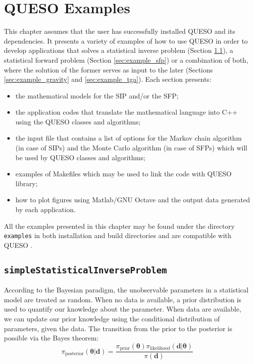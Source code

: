 

\chapter{QUESO Examples}\label{chap:Queso-examples}

This chapter assumes that the user has successfully installed QUESO and its dependencies.
%
It presents a variety of  examples of how to use QUESO in order to develop applications that solves a statistical inverse problem (Section \ref{sec:example_sip}), a statistical forward problem (Section \ref{sec:example_sfp}) or a combination of both, where the solution of the former serves as input to the later (Sections \ref{sec:example_gravity} and \ref{sec:example_tga}). 
Each section presents: 
\begin{itemize}
 \item the mathematical models for the SIP and/or the SFP; \vspace*{-6pt}
 \item the application codes  that translate the mathematical language into C++ using the QUESO classes and algorithms;\vspace*{-6pt}
 \item  the input file that contains a list of options for the Markov chain algorithm (in case of SIPs) and the Monte Carlo algorithm (in case of SFPs) which will be used by QUESO classes and algorithms;\vspace*{-6pt}
 \item examples of Makefiles which may be used to link the code  with QUESO library;\vspace*{-6pt}
 \item how to plot figures using Matlab/GNU Octave  and the output data generated by each application. 
\end{itemize}


All the examples presented in this chapter may be found under the directory \texttt{examples} in both \Queso{} installation and build directories and are compatible with QUESO \QUESOversion{}. 


\section{\texttt{simpleStatisticalInverseProblem}}\label{sec:example_sip}

According to the Bayesian paradigm, the unobservable parameters
in a statistical model are treated as random. When no data is available,
a prior distribution is used to quantify our knowledge about the parameter.
When data are available, we can update our prior knowledge using the conditional distribution of parameters, given the data. 
The transition from the prior to the posterior is possible via the Bayes theorem:
\begin{equation*}
\pi_{\text{posterior}}(\boldsymbol{\theta}|\mathbf{d})=\frac{\pi_{\text{prior}}(\boldsymbol{\theta})\pi_{\text{likelihood}}(\mathbf{d}|\boldsymbol{\theta})}{\pi(\mathbf{d})}
\end{equation*}


